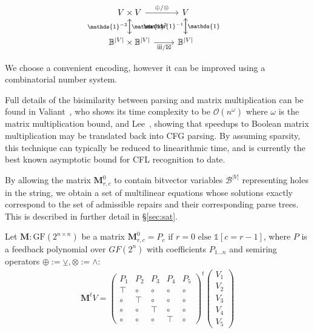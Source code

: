 \documentclass[sigplan,nonacm]{acmart}\settopmatter{printfolios=false,printccs=false,printacmref=false}
\begin{document}
\[\begin{tikzcd}
  V \times V \arrow[r, "\oplus/\otimes"] \arrow[d, "\mathds{1}^2"]
  & V \arrow[d, "\mathds{1}\phantom{^{-1}}"] \\
  \mathbb{B}^{|V|} \times \mathbb{B}^{|V|} \arrow[r, "\boxplus/\boxtimes", labels=below] \arrow[u, "\mathds{1}^{-2}"]
  & \mathbb{B}^{|V|} \arrow[u, "\mathds{1}^{-1}"]
\end{tikzcd}\]

We choose a convenient encoding, however it can be improved using a combinatorial number system.

Full details of the bisimilarity between parsing and matrix multiplication can be found in Valiant~\cite{valiant1975general}, who shows its time complexity to be $\mathcal{O}(n^\omega)$ where $\omega$ is the matrix multiplication bound, and Lee~\cite{lee2002fast}, showing that speedups to Boolean matrix multiplication may be translated back into CFG parsing. By assuming sparsity, this technique can typically be reduced to linearithmic time, and is currently the best known asymptotic bound for CFL recognition to date.

By allowing the matrix $\mathbf{M}^0_{r, c}$ to contain bitvector variables $\mathcal{B}^{|V|}$ representing holes in the string, we obtain a set of multilinear equations whose solutions exactly correspond to the set of admissible repairs and their corresponding parse trees. This is described in further detail in \S\ref{sec:sat}.

\noindent Let $\textbf{M}: \text{GF}(2^{n\times n})$ be a matrix $\mathbf{M}^0_{r, c} = P_c \text{ if } r=0 \text{ else } \mathds{1}[c = r - 1]$, where $P$ is a feedback polynomial over $GF(2^n)$ with coefficients $P_{1\ldots n}$ and semiring operators $\oplus := \veebar, \otimes := \land$:\\

\begin{align}
    \mathbf{M}^tV = \begin{pmatrix}
                        P_1 & P_2 & P_3 & P_4 & P_5 \\
                        \top & \circ & \circ & \circ & \circ \\
                        \circ & \top & \circ & \circ & \circ \\
                        \circ & \circ & \top & \circ & \circ \\
                        \circ & \circ & \circ & \top & \circ
    \end{pmatrix}^t
    \begin{pmatrix}
        V_1 \\
        V_2 \\
        V_3 \\
        V_4 \\
        V_5
    \end{pmatrix}
\end{align}
\end{document}
